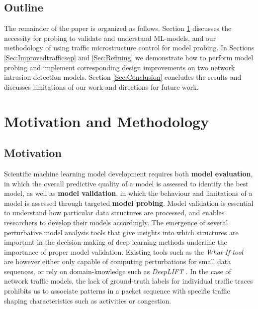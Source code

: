 \documentclass[conference]{IEEEtran}
\begin{document}
\subsection{Outline}

The remainder of the paper is organized as follows. Section \ref{Sec:Motivation} discusses the necessity for probing to validate and understand ML-models, and our methodology of using traffic microstructure control for model probing. In Sections \ref{Sec:Improvedtrafficsep} and \ref{Sec:Refining} we demonstrate how to perform model probing and implement corresponding design improvements on two network intrusion detection models. Section \ref{Sec:Conclusion} 
concludes the results and discusses limitations of our work and directions for future work.

\section{Motivation and Methodology}\label{Sec:Motivation}

\subsection{Motivation}

Scientific machine learning model development requires both \textbf{model evaluation}, in which the overall predictive quality of a model is assessed to identify the best model, as well as \textbf{model validation}, in which the behaviour and limitations of a model is assessed through targeted \textbf{model probing}. Model validation is essential to understand how particular data structures are processed, and enables researchers to develop their models accordingly. The emergence of several perturbative model analysis tools that give insights into which structures are important in the decision-making of deep learning methods underline the importance of proper model validation. Existing tools such as the \textit{What-If tool} \cite{wexler2019if} are however either only capable of computing perturbations for small data sequences, or rely on domain-knowledge such as \textit{DeepLIFT} \cite{shrikumar2017learning}. In the case of network traffic models, the lack of ground-truth labels for individual traffic traces prohibits us to associate patterns in a packet sequence with specific traffic shaping characteristics such as activities or congestion.


\end{document}
